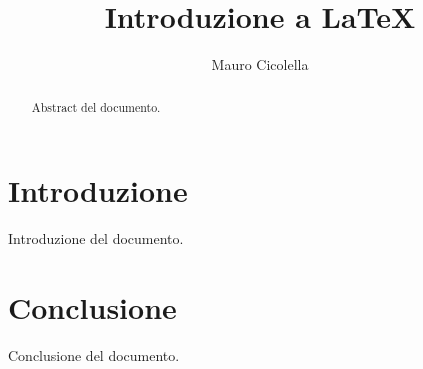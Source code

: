 \documentclass{article}
\begin{document}
\title{Introduzione a \LaTeX{}}
\author{Mauro Cicolella}

\maketitle

\begin{abstract}
Abstract del documento.
\end{abstract}

\section{Introduzione}
Introduzione del documento.

\section{Conclusione}
Conclusione del documento.
\end{document}
